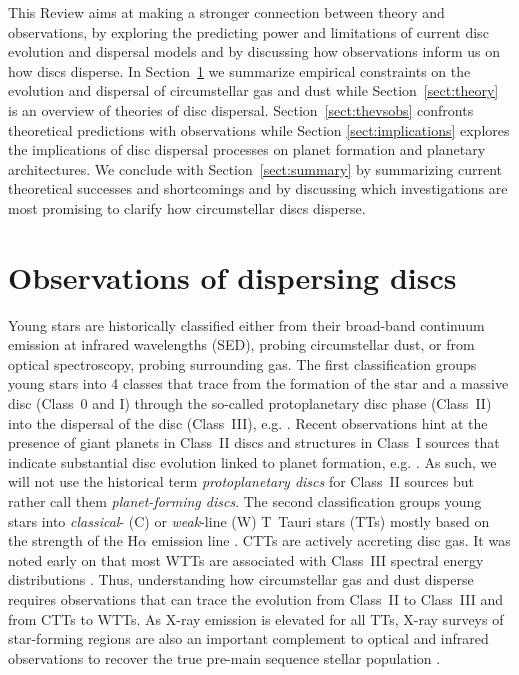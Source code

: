 \documentclass{rsos}
\begin{document}

This Review aims at making a stronger connection between theory and observations, by exploring the predicting power and limitations of current disc evolution and dispersal models and by discussing how observations inform us on how discs disperse. In Section~\ref{sect:obs} we summarize empirical constraints on the evolution and dispersal of circumstellar gas and dust while  Section~\ref{sect:theory} is an overview of theories of disc dispersal. Section~\ref{sect:thevsobs} confronts theoretical predictions with observations while Section \ref{sect:implications} explores the implications of disc dispersal processes on planet formation and planetary architectures. We conclude with Section~\ref{sect:summary} by summarizing current theoretical successes and shortcomings and by discussing which investigations are most promising to clarify how circumstellar discs disperse.


\section{Observations of dispersing discs}\label{sect:obs}

Young stars are historically classified either from their broad-band continuum emission at infrared wavelengths (SED), probing circumstellar dust, or from optical spectroscopy, probing surrounding gas. The first classification groups young stars into 4 classes that trace from the formation of the star and a massive disc (Class~0 and I) through the so-called protoplanetary disc phase (Class~II) into the dispersal of the disc (Class~III), e.g.  \cite{1984ApJ...287..610L}. Recent observations hint at the presence of giant planets in Class~II discs \cite{2015Natur.527..342S} and structures in Class~I sources that indicate substantial disc evolution linked to planet formation, e.g. \cite{2015ApJ...808L...3A}. As such, we will not use the historical term {\it protoplanetary discs} for Class~II sources but rather call them {\it planet-forming discs}.
The second classification groups young stars into {\it classical}- (C) or {\it weak}-line (W) T~Tauri stars (TTs) mostly based on the strength of the H$\alpha$ emission line  \cite{1988cels.book.....H}. CTTs are actively accreting disc gas.
It was noted early on that most WTTs are associated with Class~III spectral energy distributions 
\cite{1993prpl.conf..689M}. Thus, understanding how circumstellar gas and dust disperse requires observations that can trace the evolution from Class~II to Class~III and from CTTs to WTTs. As X-ray emission is elevated for all TTs, X-ray surveys of star-forming regions are also an important complement to optical and infrared observations to recover the true pre-main sequence stellar population  \cite{2004ApJ...614..267F}.
\end{document}
